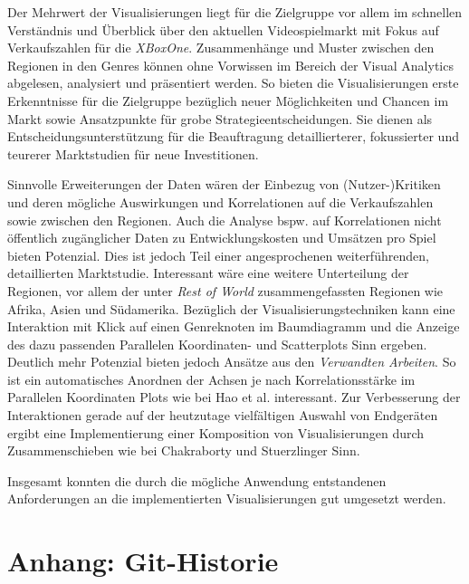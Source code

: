 \documentclass[usegeometry=true]{scrartcl}
\begin{document}
Der Mehrwert der Visualisierungen liegt für die Zielgruppe vor allem im schnellen Verständnis und Überblick über den aktuellen Videospielmarkt mit Fokus auf Verkaufszahlen für die \textit{XBoxOne}.
Zusammenhänge und Muster zwischen den Regionen in den Genres können ohne Vorwissen im Bereich der Visual Analytics abgelesen, analysiert und präsentiert werden.
So bieten die Visualisierungen erste Erkenntnisse für die Zielgruppe bezüglich neuer Möglichkeiten und Chancen im Markt sowie Ansatzpunkte für grobe Strategieentscheidungen. 
Sie dienen als Entscheidungsunterstützung für die Beauftragung detaillierterer, fokussierter und teurerer Marktstudien für neue Investitionen.

Sinnvolle Erweiterungen der Daten wären der Einbezug von (Nutzer-)Kritiken und deren mögliche Auswirkungen und Korrelationen auf die Verkaufszahlen sowie zwischen den Regionen. 
Auch die Analyse bspw. auf Korrelationen nicht öffentlich zugänglicher Daten zu Entwicklungskosten und Umsätzen pro Spiel bieten Potenzial.
Dies ist jedoch Teil einer angesprochenen weiterführenden, detaillierten Marktstudie.
Interessant wäre eine weitere Unterteilung der Regionen, vor allem der unter \textit{Rest of World} zusammengefassten Regionen wie Afrika, Asien und Südamerika.
Bezüglich der Visualisierungstechniken kann eine Interaktion mit Klick auf einen Genreknoten im Baumdiagramm und die Anzeige des dazu passenden Parallelen Koordinaten- und Scatterplots Sinn ergeben.
Deutlich mehr Potenzial bieten jedoch Ansätze aus den \textit{Verwandten Arbeiten}. 
So ist ein automatisches Anordnen der Achsen je nach Korrelationsstärke im Parallelen Koordinaten Plots wie bei Hao et al. interessant.\cite{Hao.2007}
Zur Verbesserung der Interaktionen gerade auf der heutzutage vielfältigen Auswahl von Endgeräten ergibt eine Implementierung einer Komposition von Visualisierungen durch Zusammenschieben wie bei Chakraborty und Stuerzlinger Sinn.\cite{Chakraborty.2021}

Insgesamt konnten die durch die mögliche Anwendung entstandenen Anforderungen an die implementierten Visualisierungen gut umgesetzt werden.

\section*{Anhang: Git-Historie}

\printbibliography
\end{document}
